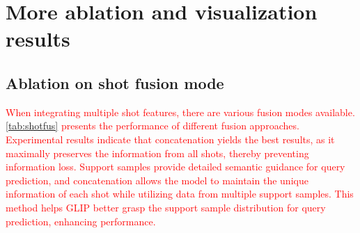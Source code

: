 \begin{table}[t]
    \centering
    \caption{Detailed 2-shot transfer results on ODinW13 subsets. The best values are highlighted in \textbf{bold}.}
    \label{tab:odinwresult}
\end{table}

\section{More ablation and visualization results}

\subsection{Ablation on shot fusion mode}
\textcolor{red}{When integrating multiple shot features, there are various fusion modes available. \cref{tab:shotfus} presents the performance of different fusion approaches. Experimental results indicate that concatenation yields the best results, as it maximally preserves the information from all shots, thereby preventing information loss. Support samples provide detailed semantic guidance for query prediction, and concatenation allows the model to maintain the unique information of each shot while utilizing data from multiple support samples. This method helps GLIP better grasp the support sample distribution for query prediction, enhancing performance.}

